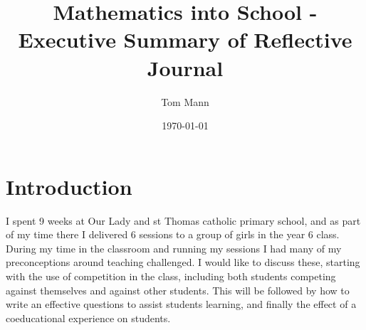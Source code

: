 \documentclass[11pt, a4paper, notitlepage]{article}
\title{Mathematics into School - Executive Summary of Reflective Journal}
\author{Tom Mann}
\date{\today}
\begin{document}
\maketitle

\section*{Introduction}
I spent 9 weeks at Our Lady and st Thomas catholic primary school, and as part of my time there I delivered 6 sessions to a group of girls in the year 6 class. During my time in the classroom and running my sessions I had many of my preconceptions around teaching challenged. I would like to discuss these, starting with the use of competition in the class, including both students competing against themselves and against other students. This will be followed by how to write an effective questions to assist students learning, and finally the effect of a coeducational experience on students.
\end{document}
